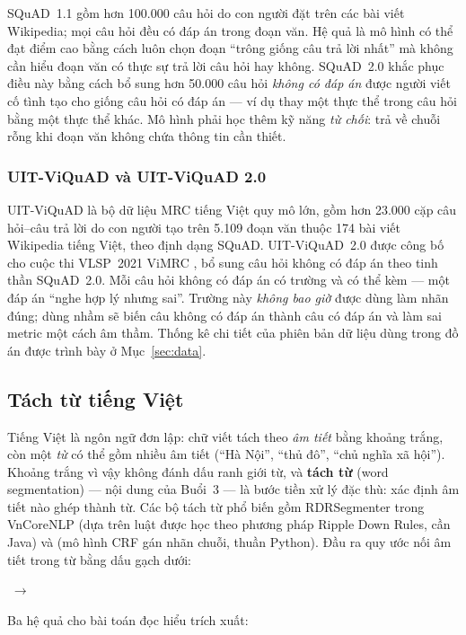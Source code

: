 SQuAD~1.1 \cite{rajpurkar2016squad} gồm hơn 100.000 câu hỏi do con người đặt trên các
bài viết Wikipedia; mọi câu hỏi đều có đáp án trong đoạn văn. Hệ quả là mô hình có thể
đạt điểm cao bằng cách luôn chọn đoạn ``trông giống câu trả lời nhất'' mà không cần
hiểu đoạn văn có thực sự trả lời câu hỏi hay không. SQuAD~2.0 \cite{rajpurkar2018know}
khắc phục điều này bằng cách bổ sung hơn 50.000 câu hỏi \emph{không có đáp án} được
người viết cố tình tạo cho giống câu hỏi có đáp án --- ví dụ thay một thực thể trong câu
hỏi bằng một thực thể khác. Mô hình phải học thêm kỹ năng \emph{từ chối}: trả về chuỗi
rỗng khi đoạn văn không chứa thông tin cần thiết.

\subsubsection{UIT-ViQuAD và UIT-ViQuAD 2.0}

UIT-ViQuAD \cite{nguyen2020viquad} là bộ dữ liệu MRC tiếng Việt quy mô lớn, gồm hơn
23.000 cặp câu hỏi--câu trả lời do con người tạo trên 5.109 đoạn văn thuộc 174 bài viết
Wikipedia tiếng Việt, theo định dạng SQuAD. UIT-ViQuAD~2.0 được công bố cho cuộc thi
VLSP~2021 ViMRC \cite{nguyen2022vlsp}, bổ sung câu hỏi không có đáp án theo tinh thần
SQuAD~2.0. Mỗi câu hỏi không có đáp án có trường  và có thể
kèm  --- một đáp án ``nghe hợp lý nhưng sai''. Trường này
\emph{không bao giờ} được dùng làm nhãn đúng; dùng nhầm sẽ biến câu không có đáp án
thành câu có đáp án và làm sai metric một cách âm thầm. Thống kê chi tiết của phiên bản
dữ liệu dùng trong đồ án được trình bày ở Mục~\ref{sec:data}.

\subsection{Tách từ tiếng Việt}
\label{sec:vietnamese}

Tiếng Việt là ngôn ngữ đơn lập: chữ viết tách theo \emph{âm tiết} bằng khoảng trắng, còn
một \emph{từ} có thể gồm nhiều âm tiết (``Hà Nội'', ``thủ đô'', ``chủ nghĩa xã hội'').
Khoảng trắng vì vậy không đánh dấu ranh giới từ, và \textbf{tách từ} (word segmentation) ---
nội dung của Buổi~3 --- là bước tiền xử lý đặc thù: xác định âm tiết nào ghép thành từ.
Các bộ tách từ phổ biến gồm RDRSegmenter trong VnCoreNLP \cite{vu2018vncorenlp} (dựa trên
luật được học theo phương pháp Ripple Down Rules, cần Java) và  \cite{pyvi}
(mô hình CRF gán nhãn chuỗi, thuần Python). Đầu ra quy ước nối âm tiết trong từ bằng dấu
gạch dưới:
\begin{center}
 $\;\longrightarrow\;$
\end{center}
Ba hệ quả cho bài toán đọc hiểu trích xuất:

